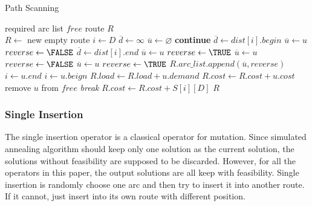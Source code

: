 \documentclass[9pt,shortpaper,twoside,web]{ieeecolor}
\begin{document}
\begin{algorithm}
 \caption{Path Scanning}
 \begin{algorithmic}[h]
 \renewcommand{\algorithmicrequire}{\textbf{Input:}}
 \renewcommand{\algorithmicensure}{\textbf{Output:}}
 \REQUIRE required arc list $free$
 \ENSURE  route $R$\\ 
 \STATE $R \gets$ new empty route
 \STATE $i \gets D$
 \WHILE{\TRUE}
 \STATE $\overline{d}\gets\infty$ 
 \STATE $\overline{u}\gets\varnothing$
 \STATE \textbf{continue}
 \ENDIF
 \STATE $\overline{d}\gets dist[i].begin$ 
 \STATE $\overline{u}\gets u$
 \STATE $reverse\gets\FALSE$
 \STATE $\overline{d}\gets dist[i].end$ 
 \STATE $\overline{u}\gets u$
 \STATE $reverse\gets\TRUE$
 \STATE $\overline{u}\gets u$
 \STATE $reverse\gets\FALSE$
 \STATE $\overline{u}\gets u$
 \STATE $reverse\gets\TRUE$
 \ENDIF 
 \ENDIF
 \ENDFOR
 \STATE $R.arc\_list.append(\overline{u}, reverse)$
 \STATE $i\gets u.end$
 \ELSE
 \STATE $i\gets u.beign$
 \ENDIF
 \STATE $R.load\gets R.load+u.demand$
 \STATE $R.cost\gets R.cost+u.cost$
 \STATE remove $u$ from $free$
 \ELSE
 \STATE \textit{break}
 \ENDIF
 \ENDWHILE
 \STATE $R.cost\gets R.cost+S[i][D]$
 \RETURN $R$
 \end{algorithmic} 
 \end{algorithm}

\subsubsection{Single Insertion}
The single insertion operator is a classical operator for mutation. Since simulated annealing algorithm should keep only one solution as the current solution, the solutions without feasibility are supposed to be discarded. However, for all the operators in this paper, the output solutions are all keep with feasibility. Single insertion is randomly choose one arc and then try to insert it into another route. If it cannot, just insert into its own route with different position.
\end{document}
